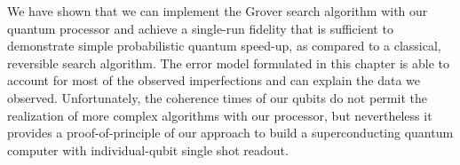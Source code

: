 We have shown that we can implement the Grover search algorithm with our quantum processor and achieve a single-run fidelity that is sufficient to demonstrate simple probabilistic quantum speed-up, as compared to a classical, reversible search algorithm. The error model formulated in this chapter is able to account for most of the observed imperfections and can explain the data we observed. Unfortunately, the coherence times of our qubits do not permit the realization of more complex algorithms with our processor, but nevertheless it provides a proof-of-principle of our approach to build a superconducting quantum computer with individual-qubit single shot readout.
